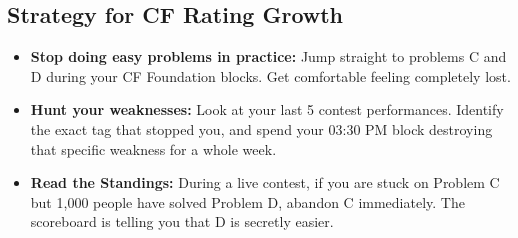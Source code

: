 \documentclass[12pt, a4paper]{article}
\begin{document}
\subsection*{Strategy for CF Rating Growth}

\begin{itemize}[leftmargin=2em, itemsep=6pt]

  \item \textbf{Stop doing easy problems in practice:} Jump straight to
        problems C and D during your CF Foundation blocks. Get comfortable
        feeling completely lost.

  \item \textbf{Hunt your weaknesses:} Look at your last 5 contest
        performances. Identify the exact tag that stopped you, and spend your
        03:30 PM block destroying that specific weakness for a whole week.

  \item \textbf{Read the Standings:} During a live contest, if you are stuck
        on Problem C but 1{,}000 people have solved Problem D, abandon C
        immediately. The scoreboard is telling you that D is secretly easier.

\end{itemize}
\end{document}
